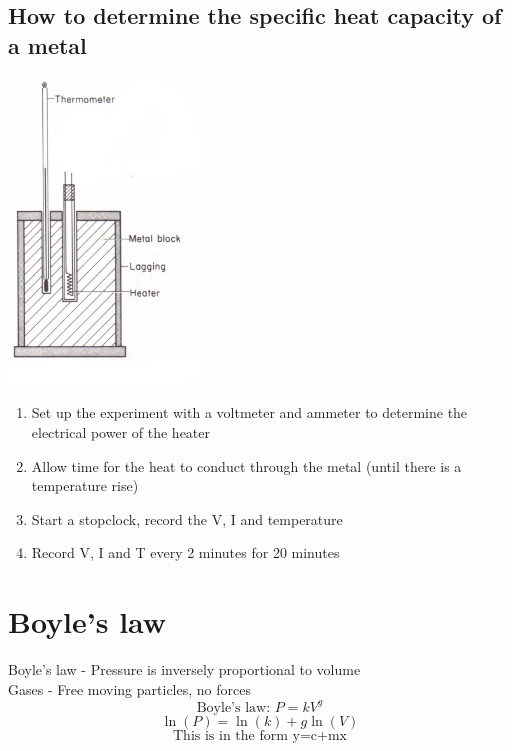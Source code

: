 \documentclass{article}[18pt]
\begin{document}
\subsection{How to determine the specific heat capacity of a metal}
\includegraphics[width=2in]{SHC_Experiment.jpg}
\begin{enumerate}
\item Set up the experiment with a voltmeter and ammeter to determine the electrical power of the heater
\item Allow time for the heat to conduct through the metal (until there is a temperature rise)
\item Start a stopclock, record the V, I and temperature
\item Record V, I and T every 2 minutes for 20 minutes
\end{enumerate}
\section{Boyle's law}
Boyle's law - Pressure is inversely proportional to volume\\
Gases - Free moving particles, no forces\\
$$\text{Boyle's law: } P=kV^{g}$$
$$\ln(P)=\ln(k)+g\ln(V)$$
$$\text{This is in the form y=c+mx}$$
\end{document}
